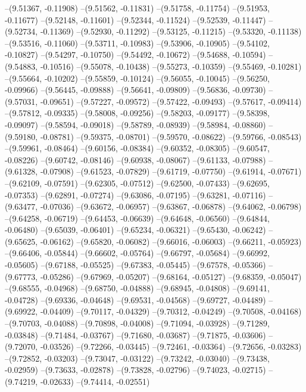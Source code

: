 --(9.51367, -0.11908)
--(9.51562, -0.11831)
--(9.51758, -0.11754)
--(9.51953, -0.11677)
--(9.52148, -0.11601)
--(9.52344, -0.11524)
--(9.52539, -0.11447)
--(9.52734, -0.11369)
--(9.52930, -0.11292)
--(9.53125, -0.11215)
--(9.53320, -0.11138)
--(9.53516, -0.11060)
--(9.53711, -0.10983)
--(9.53906, -0.10905)
--(9.54102, -0.10827)
--(9.54297, -0.10750)
--(9.54492, -0.10672)
--(9.54688, -0.10594)
--(9.54883, -0.10516)
--(9.55078, -0.10438)
--(9.55273, -0.10359)
--(9.55469, -0.10281)
--(9.55664, -0.10202)
--(9.55859, -0.10124)
--(9.56055, -0.10045)
--(9.56250, -0.09966)
--(9.56445, -0.09888)
--(9.56641, -0.09809)
--(9.56836, -0.09730)
--(9.57031, -0.09651)
--(9.57227, -0.09572)
--(9.57422, -0.09493)
--(9.57617, -0.09414)
--(9.57812, -0.09335)
--(9.58008, -0.09256)
--(9.58203, -0.09177)
--(9.58398, -0.09097)
--(9.58594, -0.09018)
--(9.58789, -0.08939)
--(9.58984, -0.08860)
--(9.59180, -0.08781)
--(9.59375, -0.08701)
--(9.59570, -0.08622)
--(9.59766, -0.08543)
--(9.59961, -0.08464)
--(9.60156, -0.08384)
--(9.60352, -0.08305)
--(9.60547, -0.08226)
--(9.60742, -0.08146)
--(9.60938, -0.08067)
--(9.61133, -0.07988)
--(9.61328, -0.07908)
--(9.61523, -0.07829)
--(9.61719, -0.07750)
--(9.61914, -0.07671)
--(9.62109, -0.07591)
--(9.62305, -0.07512)
--(9.62500, -0.07433)
--(9.62695, -0.07353)
--(9.62891, -0.07274)
--(9.63086, -0.07195)
--(9.63281, -0.07116)
--(9.63477, -0.07036)
--(9.63672, -0.06957)
--(9.63867, -0.06878)
--(9.64062, -0.06798)
--(9.64258, -0.06719)
--(9.64453, -0.06639)
--(9.64648, -0.06560)
--(9.64844, -0.06480)
--(9.65039, -0.06401)
--(9.65234, -0.06321)
--(9.65430, -0.06242)
--(9.65625, -0.06162)
--(9.65820, -0.06082)
--(9.66016, -0.06003)
--(9.66211, -0.05923)
--(9.66406, -0.05844)
--(9.66602, -0.05764)
--(9.66797, -0.05684)
--(9.66992, -0.05605)
--(9.67188, -0.05525)
--(9.67383, -0.05445)
--(9.67578, -0.05366)
--(9.67773, -0.05286)
--(9.67969, -0.05207)
--(9.68164, -0.05127)
--(9.68359, -0.05047)
--(9.68555, -0.04968)
--(9.68750, -0.04888)
--(9.68945, -0.04808)
--(9.69141, -0.04728)
--(9.69336, -0.04648)
--(9.69531, -0.04568)
--(9.69727, -0.04489)
--(9.69922, -0.04409)
--(9.70117, -0.04329)
--(9.70312, -0.04249)
--(9.70508, -0.04168)
--(9.70703, -0.04088)
--(9.70898, -0.04008)
--(9.71094, -0.03928)
--(9.71289, -0.03848)
--(9.71484, -0.03767)
--(9.71680, -0.03687)
--(9.71875, -0.03606)
--(9.72070, -0.03526)
--(9.72266, -0.03445)
--(9.72461, -0.03364)
--(9.72656, -0.03283)
--(9.72852, -0.03203)
--(9.73047, -0.03122)
--(9.73242, -0.03040)
--(9.73438, -0.02959)
--(9.73633, -0.02878)
--(9.73828, -0.02796)
--(9.74023, -0.02715)
--(9.74219, -0.02633)
--(9.74414, -0.02551)
